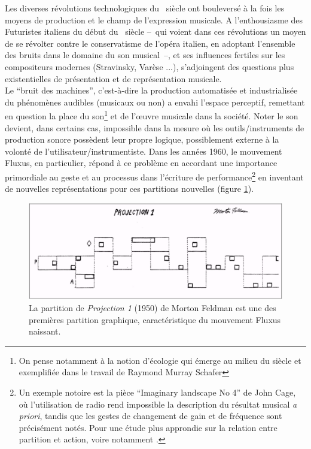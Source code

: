 \indent Les diverses révolutions technologiques du ~siècle ont bouleversé à la fois les moyens de production et le champ de l'expression musicale. A l'enthousiasme des Futuristes italiens du début du ~siècle --~qui voient dans ces révolutions un moyen de se révolter contre le conservatisme de l'opéra italien, en adoptant l'ensemble des bruits dans le domaine du son musical~--, et ses influences fertiles sur les compositeurs modernes (Stravinsky, Varèse ...), s'adjoingent des questions plus existentielles de présentation et de représentation musicale.\\
\indent Le ``bruit des machines'', c'est-à-dire la production automatisée et industrialisée du phénomènes audibles (musicaux ou non) a envahi l'espace perceptif, remettant en question la place du son\footnote{On pense notamment à la notion d'écologie qui émerge au milieu du siècle et exemplifiée dans le travail de Raymond Murray Schafer} et de l'œuvre musicale dans la société. Noter le son devient, dans certains cas, impossible dans la mesure où les outils/instruments de production sonore possèdent leur propre logique, possiblement externe à la volonté de l'utilisateur/instrumentiste. Dans les années 1960, le mouvement Fluxus, en particulier, répond à ce problème en accordant une importance primordiale au geste et au processus dans l'écriture de performance\footnote{Un exemple notoire est la pièce ``Imaginary landscape No 4'' de John Cage, où l'utilisation de radio rend impossible la description du résultat musical \textit{a priori}, tandis que les gestes de changement de gain et de fréquence sont précisément notés. Pour une étude plus approndie sur la relation entre partition et action, voire notamment \cite{kojs_notating_2011}.} en inventant de nouvelles représentations pour ces partitions nouvelles (figure \ref{fig:notation:feldman}).
\begin{figure}[!htbp]
	\captionsetup{format=plain}
	\includegraphics[width=\textwidth]{gfx/notation/MortonFeldman-Projection1.png}
	\caption[La partition de \textit{Projection 1} (1950) de Morton Feldman]{La partition de \textit{Projection 1} (1950) de Morton Feldman est une des premières partition graphique, caractéristique du mouvement Fluxus naissant.}
	\label{fig:notation:feldman}
\end{figure}

